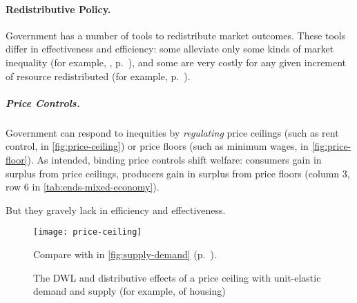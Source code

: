 
\paragraph{Redistributive Policy.}  \label{sec:redistributive-policy} Government has a number of tools to redistribute market outcomes.
These tools differ in effectiveness and efficiency:
some alleviate only some kinds of market inequality (for example, ,  p.~\pageref{sec:affirmative-action}), and some are very costly for any given increment of resource redistributed (for example,  p.~\pageref{sec:price-controls}).

\subparagraph{Price Controls.}  \label{sec:price-controls} Government can respond to inequities by \emph{regulating} price ceilings (such as rent control, in \autoref{fig:price-ceiling}) or price floors (such as minimum wages, in \autoref{fig:price-floor}).
As intended, binding price controls shift welfare:
consumers gain in surplus from price ceilings, producers gain in surplus from price floors (column 3, row 6 in \autoref{tab:ends-mixed-economy}).

But they gravely lack in efficiency and effectiveness.

\begin{figure}[htbp]
	\begin{center}
	\texttt{[image: price-ceiling]}
	\caption[Efficiency and Equity of a Price Ceiling]{The \gls{DWL} and distributive effects of a price ceiling with unit-elastic demand and supply (for example, of housing)}
	\end{center}
	\scriptsize{Compare with  in \autoref{fig:supply-demand} (p.~\pageref{fig:supply-demand}).}
	\label{fig:price-ceiling}
\end{figure}

